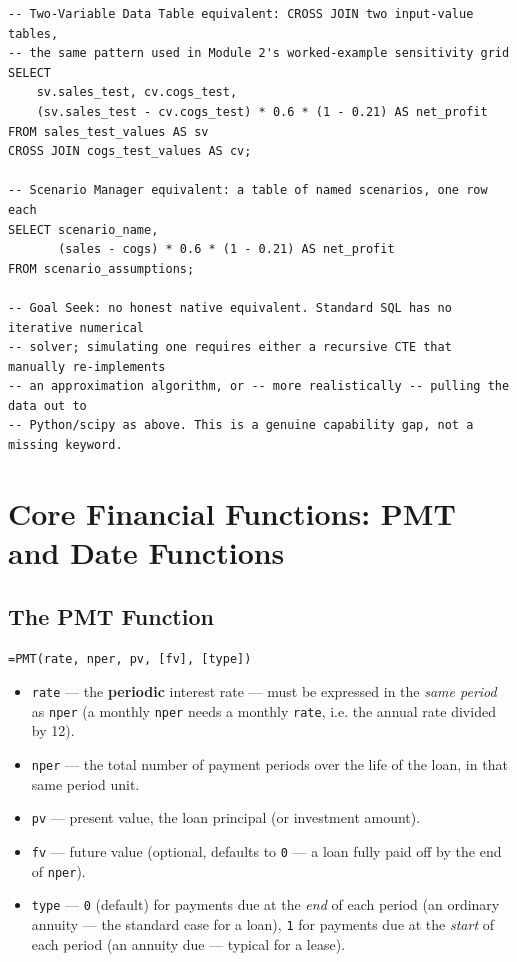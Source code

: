 \documentclass[11pt,a4paper]{article}
\begin{document}
\begin{lstlisting}[style=sqlstyle, caption={Data Table and Scenario Manager translate into SQL reasonably well via CROSS JOIN; Goal Seek genuinely does not}]
-- Two-Variable Data Table equivalent: CROSS JOIN two input-value tables,
-- the same pattern used in Module 2's worked-example sensitivity grid
SELECT
    sv.sales_test, cv.cogs_test,
    (sv.sales_test - cv.cogs_test) * 0.6 * (1 - 0.21) AS net_profit
FROM sales_test_values AS sv
CROSS JOIN cogs_test_values AS cv;

-- Scenario Manager equivalent: a table of named scenarios, one row each
SELECT scenario_name,
       (sales - cogs) * 0.6 * (1 - 0.21) AS net_profit
FROM scenario_assumptions;

-- Goal Seek: no honest native equivalent. Standard SQL has no iterative numerical
-- solver; simulating one requires either a recursive CTE that manually re-implements
-- an approximation algorithm, or -- more realistically -- pulling the data out to
-- Python/scipy as above. This is a genuine capability gap, not a missing keyword.
\end{lstlisting}

\section{Core Financial Functions: PMT and Date Functions}

\subsection{The PMT Function}
\label{sec:pmtfunction}

\begin{formulasyntax}[PMT]
\texttt{=PMT(rate, nper, pv, [fv], [type])}
\begin{itemize}
  \item \texttt{rate} --- the \textbf{periodic} interest rate --- must be expressed in the \emph{same period} as \texttt{nper} (a monthly \texttt{nper} needs a monthly \texttt{rate}, i.e. the annual rate divided by 12).
  \item \texttt{nper} --- the total number of payment periods over the life of the loan, in that same period unit.
  \item \texttt{pv} --- present value, the loan principal (or investment amount).
  \item \texttt{fv} --- future value (optional, defaults to \texttt{0} --- a loan fully paid off by the end of \texttt{nper}).
  \item \texttt{type} --- \texttt{0} (default) for payments due at the \emph{end} of each period (an ordinary annuity --- the standard case for a loan), \texttt{1} for payments due at the \emph{start} of each period (an annuity due --- typical for a lease).
\end{itemize}
\end{formulasyntax}
\end{document}
